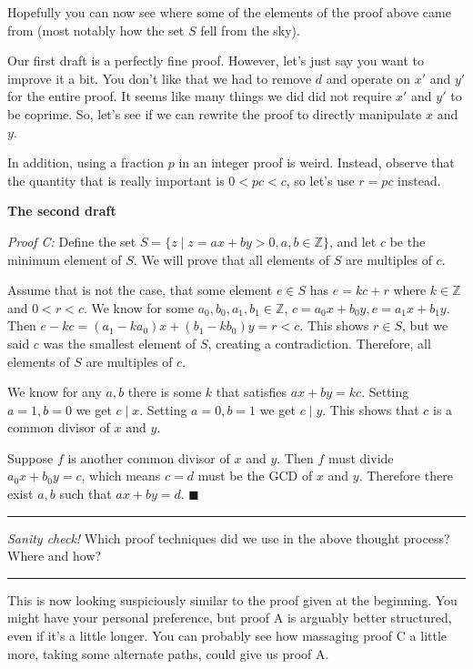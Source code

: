 \documentclass[11pt]{article}
\begin{document}
    Hopefully you can now see where some of the elements of the proof above came from
    (most notably how the set $S$ fell from the sky).
    
    Our first draft is a perfectly fine proof. However, let's just say you want to
    improve it a bit. You don't like that we had to remove $d$ and operate on $x'$ and
    $y'$ for the entire proof. It seems like many things we did did not require $x'$ and
    $y'$ to be coprime. So, let's see if we can rewrite the proof to directly manipulate
    $x$ and $y$.
    
    In addition, using a fraction $p$ in an integer proof is weird. Instead, observe that
    the quantity that is really important is $0<pc<c$, so let's use $r=pc$ instead.

    \textbf{The second draft}
    
    \textit{Proof C:} Define the set $S=\{z\mid z=ax+by>0,a,b\in\mathbb Z\}$, and
    let $c$ be the minimum element of $S$. We will prove that all elements of $S$
    are multiples of $c$.
    
    Assume that is not the case, that some element $e\in S$ has $e=kc+r$ where
    $k\in\mathbb Z$ and $0<r<c$. We know for some $a_0,b_0,a_1,b_1\in\mathbb Z$,
    $c=a_0x+b_0y,e=a_1x+b_1y$. Then $e-kc=(a_1-ka_0)x+(b_1-kb_0)y=r<c$. This
    shows $r\in S$, but we said $c$ was the smallest element of $S$, creating a 
    contradiction. Therefore, all elements of $S$ are multiples of $c$.
    
    We know for any $a,b$ there is some $k$ that satisfies $ax+by=kc$. Setting
    $a=1,b=0$ we get $c\mid x$. Setting $a=0,b=1$ we get $c\mid y$. This shows that
    $c$ is a common divisor of $x$ and $y$.
    
    Suppose $f$ is another common divisor of $x$ and $y$. Then $f$ must divide
    $a_0x+b_0y=c$, which means $c=d$ must be the GCD of $x$ and $y$. Therefore
    there exist $a,b$ such that $ax+by=d$. $\blacksquare$
    
    \rule{\textwidth}{0.4pt}
    
    \vspace{-5pt}
    \textit{Sanity check!} Which proof techniques did we use in the above thought
    process? Where and how?
    
    \vspace{-10pt}
    \rule{\textwidth}{0.4pt}
    
    This is now looking suspiciously similar to the proof given at the beginning.
    You might have your personal preference, but proof A is arguably better structured,
    even if it's a little longer. You can probably see how massaging proof C a little
    more, taking some alternate paths, could give us proof A.
    
\end{document}
